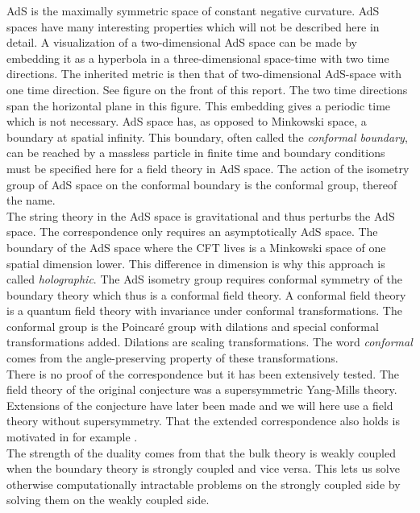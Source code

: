 \documentclass[12pt]{report}
\begin{document}
AdS is the maximally symmetric space of constant negative curvature. AdS spaces have many interesting properties which will not be described here in detail. A visualization of a two-dimensional AdS space can be made by embedding it as a hyperbola in a three-dimensional space-time with two time directions. The inherited metric is then that of two-dimensional AdS-space with one time direction. See figure on the front of this report. The two time directions span the horizontal plane in this figure. This embedding gives a periodic time which is not necessary. AdS space has, as opposed to Minkowski space, a boundary at spatial infinity. This boundary, often called the \emph{conformal boundary}, can be reached by a massless particle in finite time and boundary conditions must be specified here for a field theory in AdS space. The action of the isometry group of AdS space on the conformal boundary is the conformal group, thereof the name.\\

The string theory in the AdS space is gravitational and thus perturbs the AdS space. The correspondence only requires an asymptotically AdS space. The boundary of the AdS space where the CFT lives is a Minkowski space of one spatial dimension lower. This difference in dimension is why this approach is called \emph{holographic}. The AdS isometry group requires conformal symmetry of the boundary theory which thus is a conformal field theory.
A conformal field theory is a quantum field theory with invariance under conformal transformations. The conformal group is the Poincar\'{e} group with dilations and special conformal transformations added. Dilations are scaling transformations. The word \emph{conformal} comes from the angle-preserving property of these transformations.\\

There is no proof of the correspondence but it has been extensively tested. The field theory of the original conjecture \cite{Maldacena:1997re} was a supersymmetric Yang-Mills theory. Extensions of the conjecture have later been made and we will here use a field theory without supersymmetry. That the extended correspondence also holds is motivated in for example \cite{McGreevy:2009xe}.\\

The strength of the duality comes from that the bulk theory is weakly coupled when the boundary theory is strongly coupled and vice versa. This lets us solve otherwise computationally intractable problems on the strongly coupled side by solving them on the weakly coupled side.\\
\end{document}
